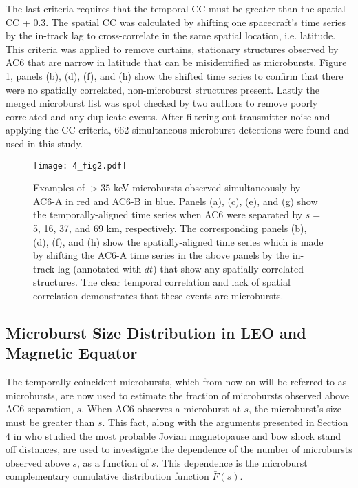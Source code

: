 The last criteria requires that the temporal CC must be greater than the spatial CC + 0.3. The spatial CC was calculated by shifting one spacecraft's time series by the in-track lag to cross-correlate in the same spatial location, i.e. latitude. This criteria was applied to remove curtains, stationary structures observed by AC6 that are narrow in latitude \citep{Blake2016} that can be misidentified as microbursts. Figure \ref{fig2}, panels (b), (d), (f), and (h) show the shifted time series to confirm that there were no spatially correlated, non-microburst structures present. Lastly the merged microburst list was spot checked by two authors to remove poorly correlated and any duplicate events. After filtering out transmitter noise and applying the CC criteria, 662 simultaneous microburst detections were found and used in this study.

\begin{figure}
\texttt{[image: 4\_fig2.pdf]}
\caption{Examples of $>35$ keV microbursts observed simultaneously by AC6-A in red and AC6-B in blue. Panels (a), (c), (e), and (g) show the temporally-aligned time series when AC6 were separated by $s=$ 5, 16, 37, and 69 km, respectively. The corresponding panels (b), (d), (f), and (h) show the spatially-aligned time series which is made by shifting the AC6-A time series in the above panels by the in-track lag (annotated with $dt$) that show any spatially correlated structures. The clear temporal correlation and lack of spatial correlation demonstrates that these events are microbursts.} 
\label{fig2}
\end{figure}
	

\subsection{Microburst Size Distribution in LEO and Magnetic Equator}\label{microburst_distribution}
The temporally coincident microbursts, which from now on will be referred to as microbursts, are now used to estimate the fraction of microbursts observed above AC6 separation, $s$. When AC6 observes a microburst at $s$, the microburst's size must be greater than $s$. This fact, along with the arguments presented in Section 4 in \citet{Joy2002} who studied the most probable Jovian magnetopause and bow shock stand off distances, are used to investigate the dependence of the number of microbursts observed above $s$, as a function of $s$. This dependence is the microburst complementary cumulative distribution function $\bar{F}(s)$. 

